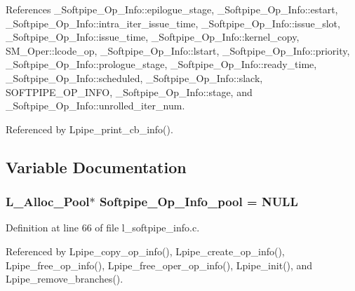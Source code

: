 References \_\-Softpipe\_\-Op\_\-Info::epilogue\_\-stage, \_\-Softpipe\_\-Op\_\-Info::estart, \_\-Softpipe\_\-Op\_\-Info::intra\_\-iter\_\-issue\_\-time, \_\-Softpipe\_\-Op\_\-Info::issue\_\-slot, \_\-Softpipe\_\-Op\_\-Info::issue\_\-time, \_\-Softpipe\_\-Op\_\-Info::kernel\_\-copy, SM\_\-Oper::lcode\_\-op, \_\-Softpipe\_\-Op\_\-Info::lstart, \_\-Softpipe\_\-Op\_\-Info::priority, \_\-Softpipe\_\-Op\_\-Info::prologue\_\-stage, \_\-Softpipe\_\-Op\_\-Info::ready\_\-time, \_\-Softpipe\_\-Op\_\-Info::scheduled, \_\-Softpipe\_\-Op\_\-Info::slack, SOFTPIPE\_\-OP\_\-INFO, \_\-Softpipe\_\-Op\_\-Info::stage, and \_\-Softpipe\_\-Op\_\-Info::unrolled\_\-iter\_\-num.

Referenced by Lpipe\_\-print\_\-cb\_\-info().

\subsection{Variable Documentation}
\subsubsection{\setlength{\rightskip}{0pt plus 5cm}L\_\-Alloc\_\-Pool$\ast$ \bf{Softpipe\_\-Op\_\-Info\_\-pool} = NULL}\label{l__softpipe__info_8c_bec30e2c6dd19674777250eed6a17946}




Definition at line 66 of file l\_\-softpipe\_\-info.c.

Referenced by Lpipe\_\-copy\_\-op\_\-info(), Lpipe\_\-create\_\-op\_\-info(), Lpipe\_\-free\_\-op\_\-info(), Lpipe\_\-free\_\-oper\_\-op\_\-info(), Lpipe\_\-init(), and Lpipe\_\-remove\_\-branches().